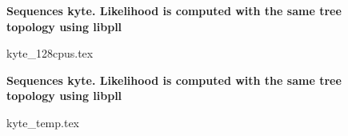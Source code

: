\documentclass[12pt,a4paper]{article}
\begin{document}
\newcommand*{\figuretitle}[1]{%
    {\centering%
    \textbf{#1}%
    \par\medskip}%
}



%

%
%
\begin{figure}
\figuretitle{Sequences kyte. Likelihood is computed with the same tree topology using libpll}
{kyte_128cpus.tex}
\end{figure}


\begin{figure}
\figuretitle{Sequences kyte. Likelihood is computed with the same tree topology using libpll}
{kyte_temp.tex}
\end{figure}
\end{document}
